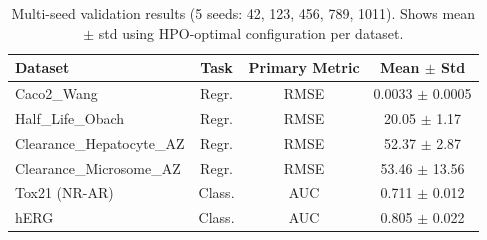\begin{table}[t]
\centering
\caption{Multi-seed validation results (5 seeds: 42, 123, 456, 789, 1011). Shows mean $\pm$ std using HPO-optimal configuration per dataset.}
\label{tab:multiseed}
\small
\begin{tabular}{lccc}
\toprule
\textbf{Dataset} & \textbf{Task} & \textbf{Primary Metric} & \textbf{Mean $\pm$ Std} \\
\midrule
Caco2\_Wang & Regr. & RMSE & 0.0033 $\pm$ 0.0005 \\
Half\_Life\_Obach & Regr. & RMSE & 20.05 $\pm$ 1.17 \\
Clearance\_Hepatocyte\_AZ & Regr. & RMSE & 52.37 $\pm$ 2.87 \\
Clearance\_Microsome\_AZ & Regr. & RMSE & 53.46 $\pm$ 13.56 \\
Tox21 (NR-AR) & Class. & AUC & 0.711 $\pm$ 0.012 \\
hERG & Class. & AUC & 0.805 $\pm$ 0.022 \\
\bottomrule
\end{tabular}
\end{table}
